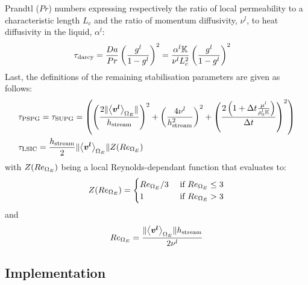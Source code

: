 Prandtl ($Pr$) numbers expressing respectively the ratio of local permeability to a characteristic length $L_c$ and the ratio of
momentum diffusivity, $\nu^l$, to heat diffusivity in the liquid, $\alpha^l$:
\begin{align}
\label{eq:supg_darcy}
& \tau_\text{darcy} = \frac{Da}{Pr} \left( \frac{{g^l}}{1-{g^l}} \right)^2= \frac{\alpha^l \mathbb{K}}{\nu^l L_c^2} \left( \frac{{g^l}}{1-{g^l}} \right)^2
\end{align}
Last, the definitions of the remaining stabilisation parameters are given as follows:
\begin{align}
\label{eq:pspg}
& \tau_\text{PSPG} = \tau_\text{SUPG} =
	\left(  
	\left( \frac{2 \lVert \left \langle \boldsymbol{v^l} \right \rangle_{\Omega_E} \rVert}{h_\text{stream}} \right)^2
   + \left( \frac{4\nu^l}{h_\text{stream}^2} \right)^2
   + \left( \frac{2\left( 1+\Delta t \frac{\mu^l}{\rho_{0}^{l} \mathbb{K}} \right)}{\Delta t} \right)^2  \right) \\
& \tau_\text{LSIC} = \frac{h_\text{stream}}{2} \lVert \left \langle \boldsymbol{v^l} \right \rangle_{\Omega_E} \rVert Z(Re_{\Omega_E})  
\end{align}
with $Z(Re_{\Omega_E})$ being a local Reynolds-dependant function that evaluates to:
\begin{align}
\label{eq:lsic}
Z(Re_{\Omega_E}) = 
\begin{cases}
  Re_{\Omega_E}/3		& \text{ if } Re_{\Omega_E} \leq 3 \\ 
  1					& \text{ if } Re_{\Omega_E} > 3
\end{cases}
\end{align}
and
\begin{align}
Re_{\Omega_E} = \frac{\lVert \left \langle \boldsymbol{v^l} \right \rangle_{\Omega_E} \rVert h_\text{stream}}{2 \nu^l}
\end{align}
\subsection{Implementation}
%

